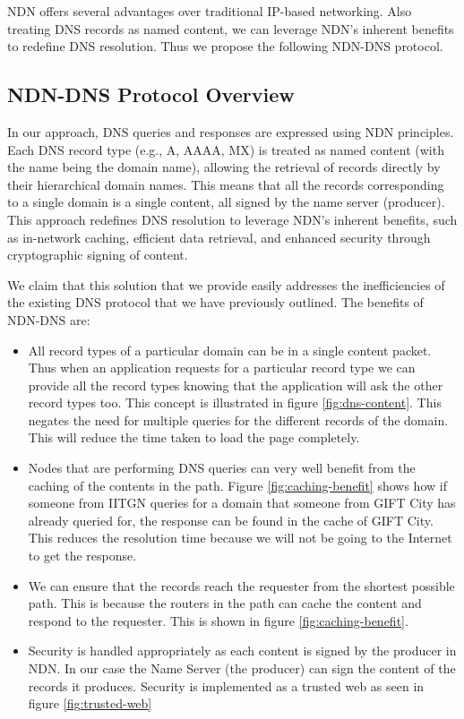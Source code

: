 \documentclass[conference]{IEEEtran}
\begin{document}
NDN offers several advantages over traditional IP-based networking. Also treating DNS records as named content, we can leverage NDN's inherent benefits to redefine DNS resolution. Thus we propose the following NDN-DNS protocol.

\subsection{NDN-DNS Protocol Overview}
In our approach, DNS queries and responses are expressed using NDN principles. Each DNS record type (e.g., A, AAAA, MX) is treated as named content (with the name being the domain name), allowing the retrieval of records directly by their hierarchical domain names. This means that all the records corresponding to a single domain is a single content, all signed by the name server (producer). This approach redefines DNS resolution to leverage NDN’s inherent benefits, such as in-network caching, efficient data retrieval, and enhanced security through cryptographic signing of content.

We claim that this solution that we provide easily addresses the inefficiencies of the existing DNS protocol that we have previously outlined. The benefits of NDN-DNS are:
\begin{itemize}
    \item All record types of a particular domain can be in a single content packet. Thus when an application requests for a particular record type we can provide all the record types knowing that the application will ask the other record types too. This concept is illustrated in figure \ref{fig:dns-content}. This negates the need for multiple queries for the different records of the domain. This will reduce the time taken to load the page completely.
    \item Nodes that are performing DNS queries can very well benefit from the caching of the contents in the path. Figure \ref{fig:caching-benefit} shows how if someone from IITGN queries for a domain that someone from GIFT City has already queried for, the response can be found in the cache of GIFT City. This reduces the resolution time because we will not be going to the Internet to get the response.
    \item We can ensure that the records reach the requester from the shortest possible path. This is because the routers in the path can cache the content and respond to the requester. This is shown in figure \ref{fig:caching-benefit}.
    \item Security is handled appropriately as each content is signed by the producer in NDN. In our case the Name Server (the producer) can sign the content of the records it produces. Security is implemented as a trusted web as seen in figure \ref{fig:trusted-web}
\end{itemize}
\end{document}
